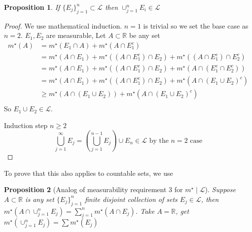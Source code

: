 \documentclass[11pt]{article}
\newtheorem*{prop}{Proposition}
\newcommand{\mstar}[1]{m^{\star}\left(#1\right)}
\begin{document}
    \begin{prop}
        If $\{ E_j \}_{j=1}^{n} \subset \mathcal{L}$ then $\cup_{j=1}^{n} E_i \in \mathcal{L}$
    \end{prop}
    
    \begin{proof}
        We use mathematical induction.
        $n=1$ is trivial so we set the base case as $n=2$.
        $E_1, E_2$ are measurable, Let $A \subset \mathbb{R}$ be any set
        \begin{align*}
            \mstar{A} &= \mstar{E_1 \cap A} + \mstar{A \cap E_1 ^{c}} \\
            &= \mstar{A \cap E_1} + \mstar{(A \cap E_1^{c}) \cap E_2} + \mstar{(A \cap E_1 ^{c}) \cap E_2 ^{c}} \\
            &= \mstar{A \cap E_1} + \mstar{(A \cap E_1^{c}) \cap E_2} + \mstar{A \cap (E_1 ^{c} \cap E_2 ^{c})} \\
            &= \mstar{A \cap E_1} + \mstar{(A \cap E_1^{c}) \cap E_2} + \mstar{A \cap (E_1 \cup E_2)^{c}}\\
            &\geq \mstar{A \cap (E_1 \cup E_2)} + \mstar{A \cap (E_1 \cup E_2)^{c}} \tag{3w} \\
        \end{align*}
        So $E_1 \cup E_2 \in \mathcal{L}$.

        Induction step $n \geq 2$
        \[
            \bigcup_{j=1}^{\infty} E_j = \left( \bigcup_{j=1}^{n-1} E_j \right) \cup E_n \in \mathcal{L} \text{ by the $n=2$ case}
        \]
    \end{proof}
    
    To prove that this also applies to countable sets, we use
    \begin{prop}[Analog of measurability requirement 3 for $m^{\star} \mid \mathcal{L}$]
        Suppose $A \subset \mathbb{R}$ is any set $\{ E_j \}_{j=1}^{n}$ finite disjoint collection of sets $E_j \in \mathcal{L}$, then $\mstar{A \cap \cup_{j=1}^{n} E_j} = \sum_{j=1}^{n} \mstar{A \cap E_j}$.
        Take $A = \mathbb{R}$, get $\mstar{\cup_{j=1}^{n}E_j} = \sum \mstar{E_j}$
    \end{prop}
\end{document}
